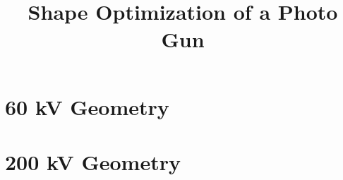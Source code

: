 \documentclass[accentcolor=9b]{tudapub}
\begin{document}
\title{Shape Optimization of a Photo Gun}
\date{}
\author{}
\maketitle

\tableofcontents

\section{60 kV Geometry}


\section{200 kV Geometry}


\clearpage
{}

\end{document}

